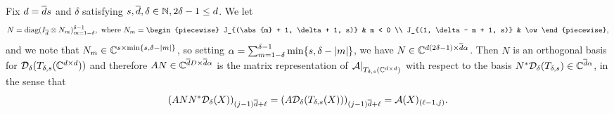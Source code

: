 \begin{proposition} \label{prop:zero_cols}
  Fix $d = \overline{d} s$ and $\delta$ satisfying $s, \overline{d}, \delta \in \mathbb{N}, 2 \delta - 1 \le d$.  We let
  \begin{equation}
    N = \diag(I_{\dbar} \otimes N_m)_{m = 1 - \delta}^{\delta - 1},\ \text{where} \ 
    N_m = \begin{piecewise}
      J_{(\abs{m} + 1, \delta + 1, s)} & m < 0 \\
      J_{(1, \delta - m + 1, s)} & \ow
    \end{piecewise}
    , \label{eq:N_and_N_m}
  \end{equation}
  and we note that $N_m \in \mathbb{C}^{s \times \min\{s, \delta - \lvert m\rvert\}}$, so setting $\alpha = \sum_{m = 1 - \delta}^{\delta - 1} \min\{s, \delta - \lvert m\rvert\}$, we have $N \in \mathbb{C}^{d (2 \delta - 1) \times \overline{d} \alpha}$.  Then $N$ is an orthogonal basis for $\mathcal{D}_\delta(T_{\delta, s}(\mathbb{C}^{d \times d}))$ and therefore $A N \in \mathbb{C}^{\overline{d} D \times \overline{d} \alpha}$ is the matrix representation of $\left.\mathcal{A}\right|_{T_{\delta, s}(\mathbb{C}^{d \times d})}$ with respect to the basis $N^* \mathcal{D}_\delta(T_{\delta, s}) \in \mathbb{C}^{\overline{d} \alpha}$, in the sense that \[(A N N^* \mathcal{D}_\delta(X))_{(j - 1) \overline{d} + \ell} = (A \mathcal{D}_\delta(T_{\delta, s}(X)))_{(j - 1) \overline{d} + \ell} = \mathcal{A}(X)_{(\ell - 1, j)}.\]
\end{proposition}
